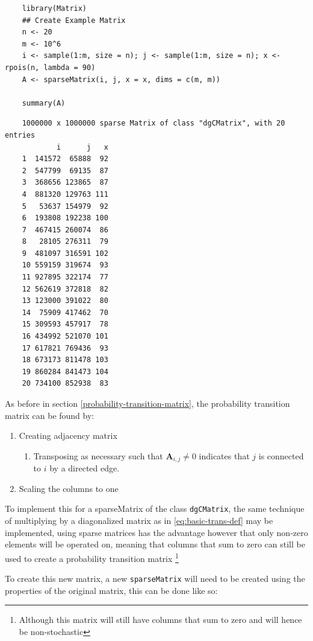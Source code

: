 \documentclass[11pt]{report}
\begin{document}
\begin{tcolorbox}
    \begin{verbatim}
    library(Matrix)
    ## Create Example Matrix
    n <- 20
    m <- 10^6
    i <- sample(1:m, size = n); j <- sample(1:m, size = n); x <- rpois(n, lambda = 90)
    A <- sparseMatrix(i, j, x = x, dims = c(m, m))

    summary(A)
    \end{verbatim}
\tcblower
    \begin{verbatim}
    1000000 x 1000000 sparse Matrix of class "dgCMatrix", with 20 entries
            i      j   x
    1  141572  65888  92
    2  547799  69135  87
    3  368656 123865  87
    4  881320 129763 111
    5   53637 154979  92
    6  193808 192238 100
    7  467415 260074  86
    8   28105 276311  79
    9  481097 316591 102
    10 559159 319674  93
    11 927895 322174  77
    12 562619 372818  82
    13 123000 391022  80
    14  75909 417462  70
    15 309593 457917  78
    16 434992 521070 101
    17 617821 769436  93
    18 673173 811478 103
    19 860284 841473 104
    20 734100 852938  83
    \end{verbatim}
\end{tcolorbox}

As before in section \ref{probability-transition-matrix}, the probability transition matrix can be found by:

\begin{enumerate}
\item Creating adjacency matrix
\begin{enumerate}
\item Transposing as necessary such that \(\mathbf{A}_{i,j}\neq 0\) indicates that \(j\) is connected to \(i\) by a directed edge.
\end{enumerate}
\item Scaling the columns to one
\end{enumerate}

To implement this for a sparseMatrix of the class \texttt{dgCMatrix}, the same
technique of multiplying by a diagonalized matrix as in \eqref{eq:basic-trans-def} may be
implemented, using sparse matrices has the advantage however that only non-zero
elements will be operated on, meaning that columns that sum to zero can still
be used to create a probability transition matrix \footnote{Although this matrix will
still have columns that sum to zero and will hence be non-stochastic}

To create this new matrix, a new \texttt{sparseMatrix} will
need to be created using the properties of the original matrix, this can be done
like so:
\end{document}

